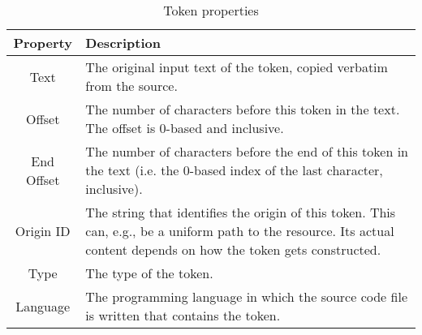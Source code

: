 
\begin{table}
	\caption{Token properties}
	\label{table:tokenProperties}
	\begin{tabularx}{\textwidth}{c|L}
		\textbf{Property} & \textbf{Description} \\
		\hline
		Text & The original input text of the token, copied verbatim from the source. \\
		Offset & The number of characters before this token in the text. The offset is 0-based and inclusive. \\
		End Offset & The number of characters before the end of this token in the text (i.e. the 0-based index of the last character, inclusive). \\
		Origin ID & The string that identifies the origin of this token. This can, e.g., be a uniform path to the resource. Its actual content depends on how the token gets constructed. \\
		Type & The type of the token. \\
		Language & The programming language in which the source code file is written that contains the token.		
	\end{tabularx}
\end{table}